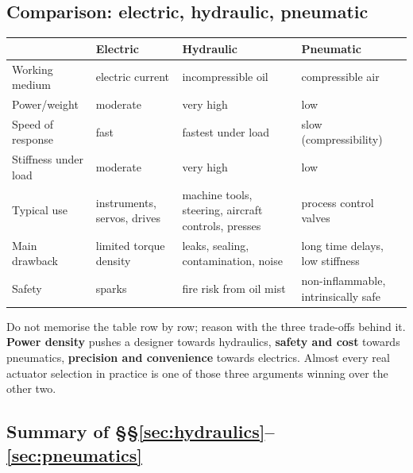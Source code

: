 \documentclass[11pt,a4paper]{article}
\begin{document}
\subsection{Comparison: electric, hydraulic, pneumatic}
\label{sss:comparison}

\begin{center}
\begin{tabular}{@{}P{0.185\textwidth}P{0.245\textwidth}P{0.245\textwidth}P{0.245\textwidth}@{}}
\toprule
 & \textbf{Electric} & \textbf{Hydraulic} & \textbf{Pneumatic}\\
\midrule
Working medium & electric current & incompressible oil & compressible air\\
Power/weight & moderate & very high & low\\
Speed of response & fast & fastest under load & slow (compressibility)\\
Stiffness under load & moderate & very high & low\\
Typical use & instruments, servos, drives & machine tools, steering, aircraft
controls, presses & process control valves\\
Main drawback & limited torque density & leaks, sealing, contamination, noise &
long time delays, low stiffness\\
Safety & sparks & fire risk from oil mist & non-inflammable, intrinsically
safe\\
\bottomrule
\end{tabular}
\end{center}

\begin{keyidea}
Do not memorise the table row by row; reason with the three trade-offs behind
it. \textbf{Power density} pushes a designer towards hydraulics,
\textbf{safety and cost} towards pneumatics, \textbf{precision and
convenience} towards electrics. Almost every real actuator selection in
practice is one of those three arguments winning over the other two.
\end{keyidea}

\subsection*{Summary of \S\S\ref{sec:hydraulics}--\ref{sec:pneumatics}}
\end{document}
